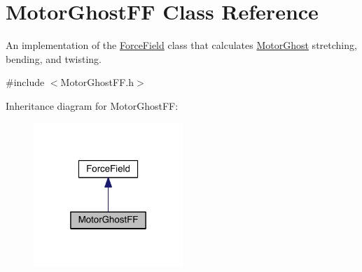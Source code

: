 \hypertarget{classMotorGhostFF}{\section{Motor\+Ghost\+F\+F Class Reference}
\label{classMotorGhostFF}
}


An implementation of the \hyperlink{classForceField}{Force\+Field} class that calculates \hyperlink{classMotorGhost}{Motor\+Ghost} stretching, bending, and twisting.  




{\ttfamily \#include $<$Motor\+Ghost\+F\+F.\+h$>$}



Inheritance diagram for Motor\+Ghost\+F\+F\+:\nopagebreak
\begin{figure}[H]
\begin{center}
\leavevmode
\includegraphics[width=160pt]{classMotorGhostFF__inherit__graph}
\end{center}
\end{figure}


